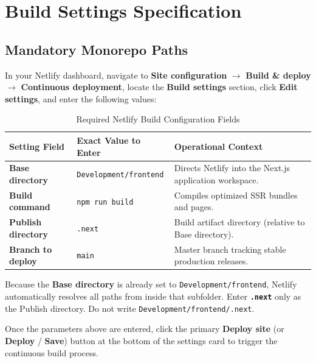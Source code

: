 \documentclass[11pt,a4paper,oneside]{book}
\begin{document}
\chapter{Build Settings Specification}

\section{Mandatory Monorepo Paths}
In your Netlify dashboard, navigate to \textbf{Site configuration} $\rightarrow$ \textbf{Build \& deploy} $\rightarrow$ \textbf{Continuous deployment}, locate the \textbf{Build settings} section, click \textbf{Edit settings}, and enter the following values:

\begin{table}[h!]
\centering
\small
\begin{tabularx}{\textwidth}{lXX}
  \toprule
  \textbf{Setting Field} & \textbf{Exact Value to Enter} & \textbf{Operational Context} \\
  \midrule
  \textbf{Base directory} & \texttt{Development/frontend} & Directs Netlify into the Next.js application workspace. \\
  \textbf{Build command} & \texttt{npm run build} & Compiles optimized SSR bundles and pages. \\
  \textbf{Publish directory} & \texttt{.next} & Build artifact directory (relative to Base directory). \\
  \textbf{Branch to deploy} & \texttt{main} & Master branch tracking stable production releases. \\
  \bottomrule
\end{tabularx}
\caption{Required Netlify Build Configuration Fields}
\label{tab:build-params}
\end{table}

\begin{infobox}
Because the \textbf{Base directory} is already set to \texttt{Development/frontend}, Netlify automatically resolves all paths from inside that subfolder. Enter \textbf{\texttt{.next}} only as the Publish directory. Do not write \texttt{Development/frontend/.next}.
\end{infobox}

\vspace{0.2cm}

\begin{goldbox}
Once the parameters above are entered, click the primary \textbf{Deploy site} (or \textbf{Deploy} / \textbf{Save}) button at the bottom of the settings card to trigger the continuous build process.
\end{goldbox}
\end{document}
